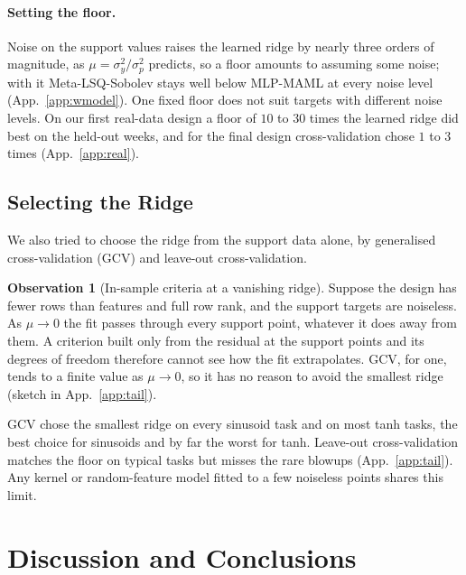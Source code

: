 \documentclass[fullpaper,final]{nldl}
\theoremstyle{plain}
\theoremstyle{definition}
\newtheorem{observation}{Observation}
\begin{document}
\paragraph{Setting the floor.}
Noise on the support values raises the learned ridge by nearly three orders of
magnitude, as $\mu = \sigma_y^2/\sigma_p^2$ predicts, so a floor amounts to assuming
some noise; with it Meta-LSQ-Sobolev stays well below MLP-MAML at every noise level
(App.~\ref{app:wmodel}). One fixed floor does not suit targets with different noise
levels. On our first real-data design a floor of $10$ to $30$ times the learned
ridge did best on the held-out weeks, and for the final design cross-validation
chose $1$ to $3$ times (App.~\ref{app:real}).

\subsection{Selecting the Ridge}
\label{sec:exp-ridge}

We also tried to choose the ridge from the support data alone, by generalised
cross-validation (GCV) and leave-out cross-validation.

\begin{observation}[In-sample criteria at a vanishing ridge]
\label{obs:ridge}
Suppose the design has fewer rows than features and full row rank, and the support
targets are noiseless. As $\mu \to 0$ the fit passes through every support point,
whatever it does away from them. A criterion built only from the residual at the
support points and its degrees of freedom therefore cannot see how the fit
extrapolates. GCV, for one, tends to a finite value as $\mu \to 0$, so it has no
reason to avoid the smallest ridge (sketch in App.~\ref{app:tail}).
\end{observation}

GCV chose the smallest ridge on every sinusoid task and on most tanh tasks, the best
choice for sinusoids and by far the worst for tanh. Leave-out cross-validation
matches the floor on typical tasks but misses the rare blowups (App.~\ref{app:tail}).
Any kernel or random-feature model fitted to a few noiseless points shares this
limit.

\section{Discussion and Conclusions}
\label{sec:discussion}
\end{document}
